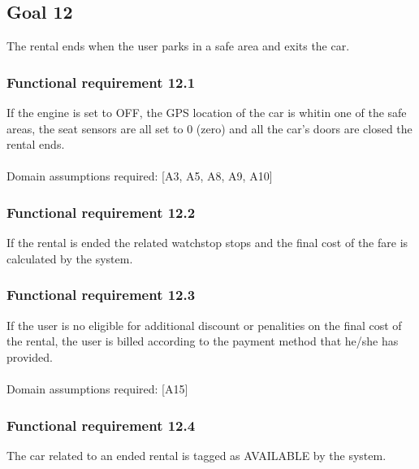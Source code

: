 \subsection{Goal 12}
The rental ends when the user parks in a safe area and exits the car.

\setcounter{secnumdepth}{3}
\subsubsection{Functional requirement 12.1}
If the engine is set to OFF, the GPS location of the car is whitin one of the safe areas, the seat sensors are all set to 0 (zero) and all the car's doors are closed the rental ends.\\~\\
\noindent Domain assumptions required: [A3, A5, A8, A9, A10]

\subsubsection{Functional requirement 12.2}
If the rental is ended the related watchstop stops and the final cost of the fare is calculated by the system.

\subsubsection{Functional requirement 12.3}
If the user is no eligible for additional discount or penalities on the final cost of the rental, the user is billed according to the payment method that he/she has provided.\\~\\
\noindent Domain assumptions required: [A15]

\subsubsection{Functional requirement 12.4}
The car related to an ended rental is tagged as AVAILABLE by the system.

